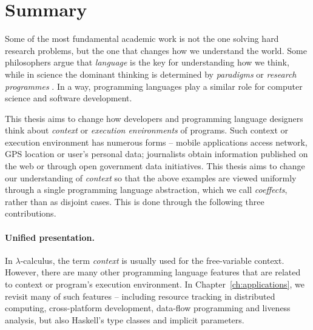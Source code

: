 %

\section{Summary}
\label{sec:conclusions-summary}

Some of the most fundamental academic work is not the one solving hard research problems, but the 
one that changes how we understand the world. Some philosophers argue that \emph{language} is the 
key for understanding how we think, while in science the dominant thinking is determined by 
\emph{paradigms} \cite{philosophy-kuhn} or \emph{research programmes} \cite{philosophy-lakatos}.
In a way, programming languages play a similar role for computer science and software development.

This thesis aims to change how developers and programming language designers think about 
\emph{context} or \emph{execution environments} of programs. Such context or execution environment
has numerous forms -- mobile applications access network, GPS location or user's personal data; 
journalists obtain information published on the web or through open government data initiatives. 
This thesis aims to change our understanding of \emph{context} so that the above examples are 
viewed uniformly through a single programming language abstraction, which we call \emph{coeffects}, 
rather than as disjoint cases. This is done through the following three contributions.

\paragraph{Unified presentation.}
In $\lambda$-calculus, the term \emph{context} is usually used for the free-variable context.
However, there are many other programming language features that are related to context or program's
execution environment. In Chapter~\ref{ch:applications}, we revisit many of such features --
including resource tracking in distributed computing, cross-platform development, data-flow 
programming and liveness analysis, but also Haskell's type classes and implicit parameters. 

